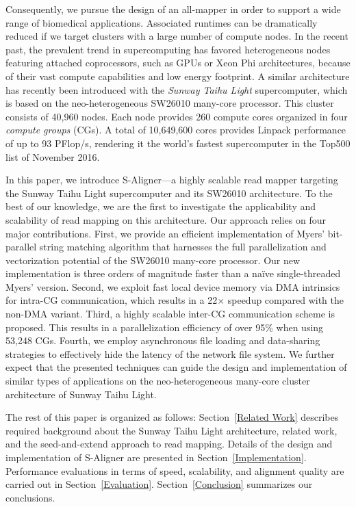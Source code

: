 \documentclass[conference]{IEEEtran}
\begin{document}
Consequently, we pursue the design of an all-mapper in order to
support a wide range of biomedical applications. Associated runtimes
can be dramatically reduced if we target clusters with a large number
of compute nodes. In the recent past, the prevalent trend in
supercomputing has favored heterogeneous nodes featuring attached
coprocessors, such as GPUs or Xeon Phi architectures, because of their
vast compute capabilities and low energy footprint. A similar
architecture has recently been introduced with the \emph{Sunway Taihu
  Light} supercomputer, which is based on the neo-heterogeneous
SW26010 many-core processor. This cluster consists of 40,960
nodes. Each node provides 260 compute cores organized in four {\em
  compute groups} (CGs). A total of 10,649,600 cores provides Linpack
performance of up to 93 PFlop/s, rendering it the world's fastest
supercomputer in the Top500 list of November 2016.

In this paper, we introduce S-Aligner---a highly scalable read mapper
targeting the Sunway Taihu Light supercomputer and its SW26010
architecture. To the best of our knowledge, we are the first to
investigate the applicability and scalability of read mapping on this
architecture. Our approach relies on four major contributions. First,
we provide an efficient implementation of Myers' bit-parallel string
matching algorithm that harnesses the full parallelization and
vectorization potential of the SW26010 many-core processor. Our new
implementation is three orders of magnitude faster than a na\"ive
single-threaded Myers' version. Second, we exploit fast local device
memory via DMA intrinsics for intra-CG communication, which results in
a 22$\times$ speedup compared with the non-DMA variant. Third, a
highly scalable inter-CG communication scheme is proposed. This
results in a parallelization efficiency of over 95\% when using 53,248
CGs. Fourth, we employ asynchronous file loading and data-sharing
strategies to effectively hide the latency of the network file
system. We further expect that the presented techniques can guide the
design and implementation of similar types of applications on the
neo-heterogeneous many-core cluster architecture of Sunway Taihu
Light.

The rest of this paper is organized as follows: Section~\ref{Related
  Work} describes required background about the Sunway Taihu Light
architecture, related work, and the seed-and-extend approach to read
mapping. Details of the design and implementation of S-Aligner are
presented in Section~\ref{Implementation}. Performance evaluations in
terms of speed, scalability, and alignment quality are carried out in
Section~\ref{Evaluation}. Section~\ref{Conclusion} summarizes our
conclusions.
\end{document}
